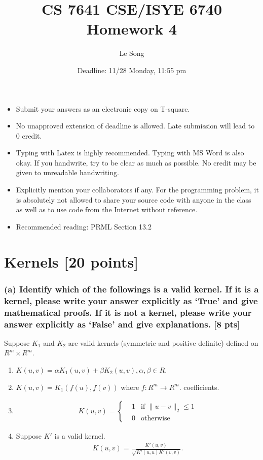 \documentclass[twoside,11pt]{article}\usepackage{amsmath,amsfonts,amsthm,fullpage}
\begin{document}
\title{CS 7641 CSE/ISYE 6740 Homework 4}
\author{Le Song}
\date{Deadline: 11/28 Monday, 11:55 pm}
\maketitle

\begin{itemize}
  \item Submit your answers as an electronic copy on T-square.
  \item No unapproved extension of deadline is allowed. Late
  submission will lead to 0 credit.
  \item Typing with Latex is highly recommended. Typing with MS Word is also okay.
  If you handwrite, try to be clear as much as possible. No credit may be given to unreadable handwriting.
  \item Explicitly mention your collaborators if any. For the programming problem, it is
  absolutely not allowed to share your source code with anyone in the
  class as well as to use code from the Internet without reference.
  \item Recommended reading: PRML Section 13.2
 \end{itemize}
 

\section{Kernels [20 points]}
\subsubsection*{(a) Identify which of the followings is a valid kernel.  If it is a kernel, please write your answer explicitly as `True' and give mathematical proofs. If it is not a kernel, please write your answer explicitly as `False' and give explanations. [8 pts]}
 Suppose $K_1$ and $K_2$ are valid kernels (symmetric and positive definite) defined on $R^m\times R^m$.
\begin{enumerate}
\item $K(u,v) = \alpha K_1(u,v) + \beta K_2(u,v), \alpha,\beta\in R$.
\item $K(u,v) = K_1(f(u), f(v))$ where $f:R^m \rightarrow R^m$.
coefficients.
\item \begin{align}
	K(u,v) = \left\{
	\begin{aligned}
	&1 & \text{if } \|u-v\|_2 \leqslant 1\\
	& 0 & \text{otherwise}
	\end{aligned}
	\right.
	\end{align}
	
\item Suppose $K'$ is a valid kernel. 
	\begin{align}
	K(u,v) = \frac{K'(u,v)}{\sqrt{K'(u,u)K'(v,v)}}.
	\end{align}
	
\end{enumerate} 
 
\end{document}

